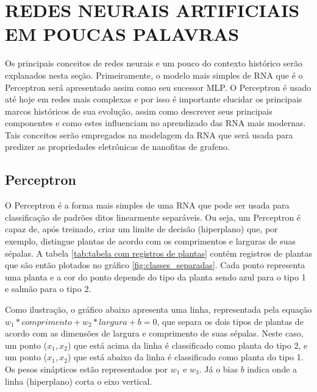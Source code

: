 \chapter{REDES NEURAIS ARTIFICIAIS EM POUCAS PALAVRAS}
\label{cap:redesneuraisempoucaspalavras}

Os principais conceitos de redes neurais e um pouco do contexto histórico serão explanados nesta seção. Primeiramente, o modelo mais simples de RNA que é o Perceptron será apresentado assim como seu sucessor MLP. O Perceptron é usado até hoje em redes mais complexas e por isso é importante elucidar os principais marcos históricos de sua evolução, assim como descrever seus principais componentes e como estes influenciam no aprendizado das RNA mais modernas. Tais conceitos serão empregados na modelagem da RNA que será usada para predizer as propriedades eletrônicas de nanofitas de grafeno.

\section{Perceptron}
\label{sec:perceptron}
O Perceptron é a forma mais simples de uma RNA que pode ser usada para classificação de padrões ditos linearmente separáveis. Ou seja, um Perceptron é capaz de, após treinado, criar um limite de decisão (hiperplano) que, por exemplo, distingue plantas de acordo com os comprimentos e larguras de suas sépalas. 
A tabela \ref{tab:tabela com registros de plantas} contém registros de plantas que são então plotados no gráfico \ref{fig:classes_separadas}. Cada ponto representa uma planta e a cor do ponto depende do tipo da planta sendo azul para o tipo 1 e salmão para o tipo 2.



Como ilustração, o gráfico abaixo apresenta uma linha, representada pela equação $w_1 * comprimento + w_2 * largura + b = 0 $, que separa os dois tipos de plantas de acordo com as dimensões de largura e comprimento de suas sépalas. Neste caso, um ponto ($x_1, x_2$) que está acima da linha é classificado como planta do tipo 2, e um ponto ($x_1, x_2$) que está abaixo da linha é classificado como planta do tipo 1. Os pesos sinápticos estão representados por $w_1$ e $w_3$. Já o bias $b$ indica onde a linha (hiperplano) corta o eixo vertical.

